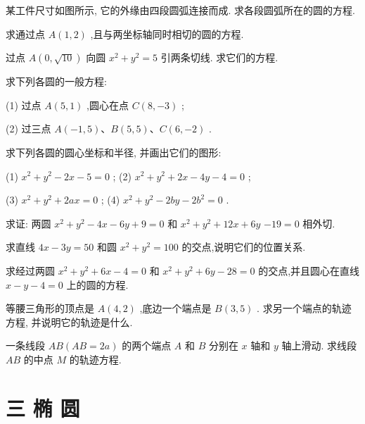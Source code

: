 \documentclass[lang=cn,newtx,10pt,scheme=chinese]{elegantbook}
\begin{document}
\begin{problemset}[习 题 五]
\item 某工件尺寸如图所示, 它的外缘由四段圆弧连接而成. 求各段圆弧所在的圆的方程.

\item 求通过点 \(A\left( {1,2}\right)\) ,且与两坐标轴同时相切的圆的方程.

\item 过点 \(A\left( {0,\sqrt{10}}\right)\) 向圆 \({x}^{2} + {y}^{2} = 5\) 引两条切线. 求它们的方程.

\item 求下列各圆的一般方程:

(1) 过点 \(A\left( {5,1}\right)\) ,圆心在点 \(C\left( {8, - 3}\right)\) ;

(2) 过三点 \(A\left( {-1,5}\right) \text{、}B\left( {5,5}\right) \text{、}C\left( {6, - 2}\right)\) .

\item 求下列各圆的圆心坐标和半径, 并画出它们的图形:

(1) \({x}^{2} + {y}^{2} - {2x} - 5 = 0\) ; (2) \({x}^{2} + {y}^{2} + {2x} - {4y} - 4 = 0\) ;

(3) \({x}^{2} + {y}^{2} + {2ax} = 0\) ; (4) \({x}^{2} + {y}^{2} - {2by} - 2{b}^{2} = 0\) .

\item 求证: 两圆 \({x}^{2} + {y}^{2} - {4x} - {6y} + 9 = 0\) 和 \({x}^{2} + {y}^{2} + {12x} + {6y}\) \(- {19} = 0\) 相外切.

\item 求直线 \({4x} - {3y} = {50}\) 和圆 \({x}^{2} + {y}^{2} = {100}\) 的交点,说明它们的位置关系.

\item 求经过两圆 \({x}^{2} + {y}^{2} + {6x} - 4 = 0\) 和 \({x}^{2} + {y}^{2} + {6y} - {28} = 0\) 的交点,并且圆心在直线 \(x - y - 4 = 0\) 上的圆的方程.

\item 等腰三角形的顶点是 \(A\left( {4,2}\right)\) ,底边一个端点是 \(B\left( {3,5}\right)\) . 求另一个端点的轨迹方程, 并说明它的轨迹是什么.

\item 一条线段 \({AB}\left( {{AB} = {2a}}\right)\) 的两个端点 \(A\) 和 \(B\) 分别在 \(x\) 轴和 \(y\) 轴上滑动. 求线段 \({AB}\) 的中点 \(M\) 的轨迹方程.
\end{problemset}

\section*{三 椭 圆}
\end{document}
